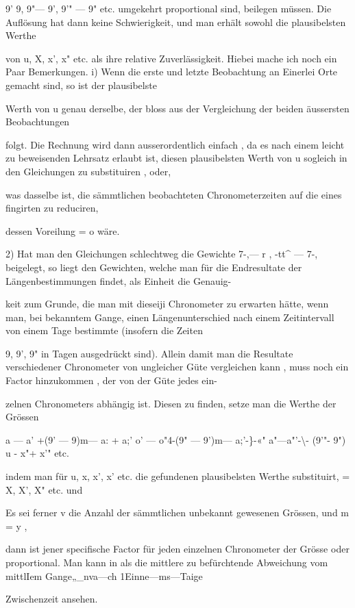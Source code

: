 \documentclass[10pt,a4paper]{article}
\begin{document}
9' 9, 9"— 9', 9'" — 9" etc. umgekehrt proportional sind, beilegen müssen. Die Auflösung hat dann keine Schwierigkeit, und man erhält sowohl die plausibelsten Werthe

von u, X, x', x" etc. als ihre relative Zuverlässigkeit. Hiebei mache ich noch ein Paar Bemerkungen. i) Wenn die erste und letzte Beobachtung an Einerlei Orte gemacht sind, so ist der plausibelste

Werth von u genau derselbe, der bloss aus der Vergleichung der beiden äussersten Beobachtungen

folgt. Die Rechnung wird dann ausserordentlich einfach , da es nach einem leicht zu beweisenden Lehrsatz erlaubt ist, diesen plausibelsten Werth von u sogleich in den Gleichungen zu substituiren , oder,

was dasselbe ist, die sämmtlichen beobachteten Chronometerzeiten auf die eines fingirten zu reduciren,

dessen Voreilung = o wäre.

2) Hat man den Gleichungen schlechtweg die Gewichte 7-,— r , -tt\textasciicircum{} — 7-, beigelegt, so liegt den Gewichten, welche man für die Endresultate der Längenbestimmungen findet, als Einheit die Genauig-

keit zum Grunde, die man mit dieseiji Chronometer zu erwarten hätte, wenn man, bei bekanntem Gange, einen Längenunterschied nach einem Zeitintervall von einem Tage bestimmte (insofern die Zeiten

9, 9', 9" in Tagen ausgedrückt sind). Allein damit man die Resultate verschiedener Chronometer von ungleicher Güte vergleichen kann , muss noch ein Factor hinzukommen , der von der Güte jedes ein-

zelnen Chronometers abhängig ist. Diesen zu finden, setze man die Werthe der Grössen

a — a' +(9' — 9)m— a: + a;' o' — o"4-(9" — 9')m— a;'-\}-«" a"—a"'-\textbackslash{}- (9'"- 9") u - x"+ x'" etc.

indem man für u, x, x', x' etc. die gefundenen plausibelsten Werthe substituirt, = X, X', X" etc. und

Es sei ferner v die Anzahl der sämmtlichen unbekannt gewesenen Grössen, und m = y ,

dann ist jener specifische Factor für jeden einzelnen Chronometer der Grösse oder proportional. Man kann in als die mittlere zu befürchtende Abweichung vom mittlIem Gange„\_nva—ch 1Einne—ms—Taige

Zwischenzeit ansehen.
\end{document}

